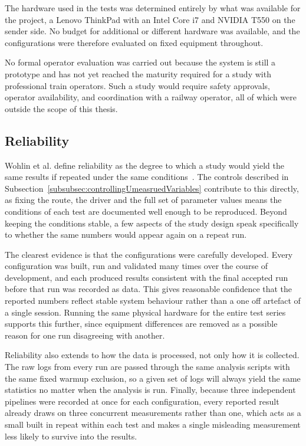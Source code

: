 The hardware used in the tests was determined entirely by what was available for the project, a Lenovo ThinkPad with an Intel Core i7 and NVIDIA T550 on the sender side. No budget for additional or different hardware was available, and the configurations were therefore evaluated on fixed equipment throughout.

No formal operator evaluation was carried out because the system is still a prototype and has not yet reached the maturity required for a study with professional train operators. Such a study would require safety approvals, operator availability, and coordination with a railway operator, all of which were outside the scope of this thesis.

\vspace{5mm}
\subsection{Reliability}

Wohlin et al. define reliability as the degree to which a study would yield the same results if repeated under the same conditions~\cite{wohlin2012}. The controls described in Subsection~\ref{subsubsec:controllingUmeasruedVariables} contribute to this directly, as fixing the route, the driver and the full set of parameter values means the conditions of each test are documented well enough to be reproduced. Beyond keeping the conditions stable, a few aspects of the study design speak specifically to whether the same numbers would appear again on a repeat run.

The clearest evidence is that the configurations were carefully developed. Every configuration was built, run and validated many times over the course of development, and each produced results consistent with the final accepted run before that run was recorded as data. This gives reasonable confidence that the reported numbers reflect stable system behaviour rather than a one off artefact of a single session. Running the same physical hardware for the entire test series supports this further, since equipment differences are removed as a possible reason for one run disagreeing with another.

Reliability also extends to how the data is processed, not only how it is collected. The raw logs from every run are passed through the same analysis scripts with the same fixed warmup exclusion, so a given set of logs will always yield the same statistics no matter when the analysis is run. Finally, because three independent pipelines were recorded at once for each configuration, every reported result already draws on three concurrent measurements rather than one, which acts as a small built in repeat within each test and makes a single misleading measurement less likely to survive into the results.

